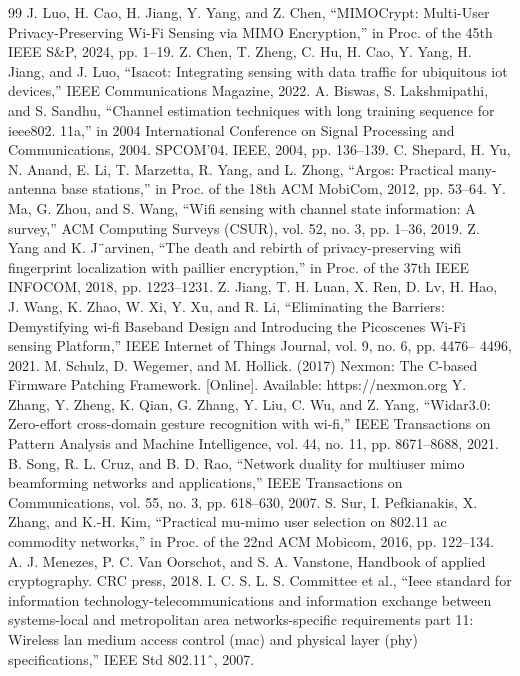 \documentclass[journal]{IEEEtran}
\begin{document}
\begin{thebibliography}{99}
 J. Luo, H. Cao, H. Jiang, Y. Yang, and Z. Chen, “MIMOCrypt: Multi-User Privacy-Preserving Wi-Fi Sensing via MIMO Encryption,” in Proc. of the 45th IEEE S\&P, 2024, pp. 1–19.
 Z. Chen, T. Zheng, C. Hu, H. Cao, Y. Yang, H. Jiang, and J. Luo, “Isacot: Integrating sensing with data traffic for ubiquitous iot devices,” IEEE Communications Magazine, 2022.
 A. Biswas, S. Lakshmipathi, and S. Sandhu, “Channel estimation techniques with long training sequence for ieee802. 11a,” in 2004 International Conference on Signal Processing and Communications, 2004. SPCOM’04. IEEE, 2004, pp. 136–139.
 C. Shepard, H. Yu, N. Anand, E. Li, T. Marzetta, R. Yang, and L. Zhong, “Argos: Practical many-antenna base stations,” in Proc. of the 18th ACM MobiCom, 2012, pp. 53–64.
 Y. Ma, G. Zhou, and S. Wang, “Wifi sensing with channel state information: A survey,” ACM Computing Surveys (CSUR), vol. 52, no. 3, pp. 1–36, 2019.
 Z. Yang and K. J¨arvinen, “The death and rebirth of privacy-preserving wifi fingerprint localization with paillier encryption,” in Proc. of the 37th IEEE INFOCOM, 2018, pp. 1223–1231.
 Z. Jiang, T. H. Luan, X. Ren, D. Lv, H. Hao, J. Wang, K. Zhao, W. Xi, Y. Xu, and R. Li, “Eliminating the Barriers: Demystifying wi-fi Baseband Design and Introducing the Picoscenes Wi-Fi sensing Platform,” IEEE Internet of Things Journal, vol. 9, no. 6, pp. 4476– 4496, 2021.
 M. Schulz, D. Wegemer, and M. Hollick. (2017) Nexmon: The C-based Firmware Patching Framework. [Online]. Available: https://nexmon.org
 Y. Zhang, Y. Zheng, K. Qian, G. Zhang, Y. Liu, C. Wu, and Z. Yang, “Widar3.0: Zero-effort cross-domain gesture recognition with wi-fi,” IEEE Transactions on Pattern Analysis and Machine Intelligence, vol. 44, no. 11, pp. 8671–8688, 2021.
 B. Song, R. L. Cruz, and B. D. Rao, “Network duality for multiuser mimo beamforming networks and applications,” IEEE Transactions on Communications, vol. 55, no. 3, pp. 618–630, 2007.
 S. Sur, I. Pefkianakis, X. Zhang, and K.-H. Kim, “Practical mu-mimo user selection on 802.11 ac commodity networks,” in Proc. of the 22nd ACM Mobicom, 2016, pp. 122–134.
 A. J. Menezes, P. C. Van Oorschot, and S. A. Vanstone, Handbook of applied cryptography. CRC press, 2018.
 I. C. S. L. S. Committee et al., “Ieee standard for information technology-telecommunications and information exchange between systems-local and metropolitan area networks-specific requirements part 11: Wireless lan medium access control (mac) and physical layer (phy) specifications,” IEEE Std 802.11ˆ, 2007.

\end{thebibliography}
\end{document}
